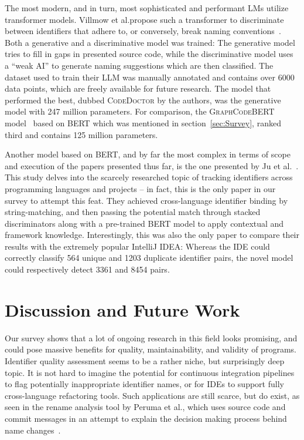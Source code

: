 \documentclass[conference]{IEEEtran}
\begin{document}
The most modern, and in turn, most sophisticated and performant \acp{LM} utilize
transformer models. Villmow et al.\@ propose such a transformer to discriminate between
identifiers that adhere to, or conversely, break naming
conventions~\cite{Villmow2023Violations}. Both a generative and a discriminative model was
trained: The generative model tries to fill in gaps in presented source code, while the
discriminative model uses a \enquote{weak \ac{AI}} to generate naming suggestions which
are then classified. The dataset used to train their \ac{LLM} was manually annotated and
contains over 6000 data points, which are freely available for future research. The model
that performed the best, dubbed \textsc{CodeDoctor} by the authors, was the generative
model with 247 million parameters. For comparison, the \textsc{GraphCodeBERT}
model~\cite{Guo2020GraphCodeBERT} based on BERT which was mentioned in
section~\ref{sec:Survey}, ranked third and contains 125 million parameters.

Another model based on BERT, and by far the most complex in terms of scope and execution
of the papers presented thus far, is the one presented by Ju et
al.\@~\cite{Ju2023XLangBinding}. This study delves into the scarcely researched topic of
tracking identifiers across programming languages and projects -- in fact, this is the
only paper in our survey to attempt this feat. They achieved cross-language identifier
binding by string-matching, and then passing the potential match through stacked
discriminators along with a pre-trained BERT model to apply contextual and framework
knowledge. Interestingly, this was also the only paper to compare their results with the
extremely popular IntelliJ IDEA: Whereas the IDE could correctly classify 564 unique and
1203 duplicate identifier pairs, the novel model could respectively detect 3361 and 8454
pairs.



\section{Discussion and Future Work}
\label{sec:Discussion-and-Future-Work}

Our survey shows that a lot of ongoing research in this field looks promising, and could
pose massive benefits for quality, maintainability, and validity of programs. Identifier
quality assessment seems to be a rather niche, but surprisingly deep topic. It is not hard
to imagine the potential for continuous integration pipelines to flag potentially
inappropriate identifier names, or for IDEs to support fully cross-language refactoring
tools. Such applications are still scarce, but do exist, as seen in the rename analysis
tool by Peruma et al.\@, which uses source code and commit messages in an attempt to
explain the decision making process behind name changes~\cite{Peruma2019}.
\end{document}
